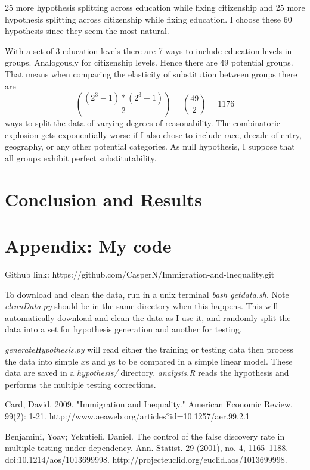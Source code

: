 \documentclass[11pt]{article}
\theoremstyle{definition}
\theoremstyle{remark}
\begin{document}
25 more hypothesis splitting across education while fixing citizenship
and 25 more hypothesis splitting across citizenship while fixing education.
I choose these 60 hypothesis since they seem the most natural.

With a set of 3 education levels there are 7 ways to include education levels
in groups. Analogously for citizenship levels. Hence there are 49 potential groups.
That means when comparing the elasticity of substitution between groups there are
$${(2^3-1) * (2^3-1) \choose 2} = {49\choose 2} = 1176$$
ways to split the data
of varying degrees of reasonability. The combinatoric explosion gets exponentially
worse if I also chose to include race, decade of entry, geography, or any other
potential categories. As null hypothesis, I suppose that all groups exhibit
perfect substitutability.


\section{Conclusion and Results}

\section{Appendix: My code}

Github link: https://github.com/CasperN/Immigration-and-Inequality.git

To download and clean the data, run in a unix terminal \textit{bash getdata.sh}.
Note \textit{cleanData.py} should be in the same directory when this happens.
This will automatically download and clean the data as I use it, and randomly
split the data into a set for hypothesis generation and another for testing.

\textit{generateHypothesis.py} will read either the training or testing data
then process the data into simple $x$s and $y$s to be compared in a simple
linear model. These data are saved in a \textit{hypothesis/} directory.
\textit{analysis.R} reads the hypothesis and performs the multiple testing
corrections.

\listoffigures
\listoftables
\begin{thebibliography}
\small
     Card, David. 2009. "Immigration and Inequality." American Economic Review, 99(2): 1-21. http://www.aeaweb.org/articles?id=10.1257/aer.99.2.1

     Benjamini, Yoav; Yekutieli, Daniel. The control of the false discovery rate in multiple testing under dependency. Ann. Statist. 29 (2001), no. 4, 1165--1188. doi:10.1214/aos/1013699998. http://projecteuclid.org/euclid.aos/1013699998.
\end{thebibliography}
\end{document}
